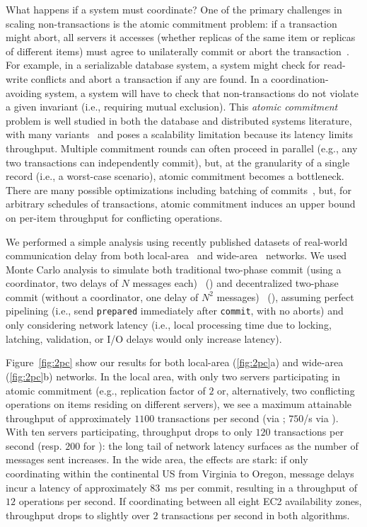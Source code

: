 What happens if a system must coordinate? One of the primary
challenges in scaling non-\cfree transactions is the atomic commitment
problem: if a transaction might abort, all servers it accesses
(whether replicas of the same item or replicas of different items)
must agree to unilaterally commit or abort the
transaction~\cite{bernstein-book}. For example, in a serializable
database system, a system might check for read-write conflicts and
abort a transaction if any are found. In a coordination-avoiding
system, a system will have to check that non-\iconfluent transactions
do not violate a given invariant (i.e., requiring mutual
exclusion). This \textit{atomic commitment} problem is well studied in
both the database and distributed systems literature, with many
variants~\cite{atomictransactions,paxos-commit,traiger-tods} and poses
a scalability limitation because its latency limits
throughput. Multiple commitment rounds can often proceed in parallel
(e.g., any two \iconfluent transactions can independently commit),
but, at the granularity of a single record (i.e., a worst-case
scenario), atomic commitment becomes a bottleneck. There are many
possible optimizations including batching of commits~\cite{calvin},
but, for arbitrary schedules of transactions, atomic commitment
induces an upper bound on per-item throughput for conflicting
operations.

We performed a simple analysis using recently published datasets of
real-world communication delay from both local-area~\cite{bobtail} and
wide-area~\cite{hat-vldb} networks. We used Monte Carlo analysis to
simulate both traditional two-phase commit (using a coordinator, two
delays of $N$ messages each)~\cite{bernstein-book} (\cpc) and
decentralized two-phase commit (without a coordinator, one delay of
$N^2$ messages)~\cite{paxos-commit} (\dpc), assuming perfect
pipelining (i.e., send \texttt{prepared} immediately after
\texttt{commit}, with no aborts) and only considering network latency
(i.e., local processing time due to locking, latching, validation, or
I/O delays would only increase latency).

Figure~\ref{fig:2pc} show our results for both local-area
(\ref{fig:2pc}a) and wide-area (\ref{fig:2pc}b) networks.  In the
local area, with only two servers participating in atomic commitment
(e.g., replication factor of $2$ or, alternatively, two conflicting
operations on items residing on different servers), we see a maximum
attainable throughput of approximately $1100$ transactions per second
(via \dpc; $750$/s via \cpc). With ten servers participating, \dpc
throughput drops to only $120$ transactions per second (resp. $200$
for \cpc): the long tail of network latency surfaces as the number of
messages sent increases. In the wide area, the effects are stark: if
only coordinating within the continental US from Virginia to Oregon,
\dpc message delays incur a latency of approximately $83$~ms per
commit, resulting in a throughput of $12$ operations per second. If
coordinating between all eight EC2 availability zones, throughput
drops to slightly over $2$ transactions per second in both algorithms.

